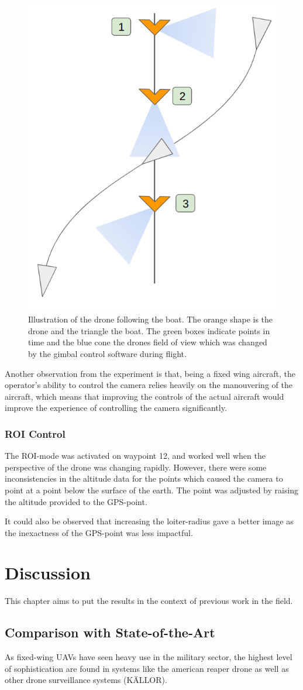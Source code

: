 \documentclass[nofilelist]{cslthse-msc}
\begin{document}
\begin{figure}[htp]
   \centering
   \includegraphics[width=.33\textwidth]{images/drone-boat-illustration.png}
   \caption{Illustration of the drone following the boat. The orange shape is the drone and the triangle the boat. The green boxes indicate points in time and the blue cone the drones field of view which was changed by the gimbal control software during flight.}
   \label{fig:boat-follow}
\end{figure}

Another observation from the experiment is that, being a fixed wing aircraft, the operator's ability to control the camera relies heavily on the manouvering of the aircraft, which means that improving the controls of the actual aircraft would improve the experience of controlling the camera significantly. 

\subsection{ROI Control}
The ROI-mode was activated on waypoint 12, and worked well when the perspective of the drone was changing rapidly. However, there were some inconsistencies in the altitude data for the points which caused the camera to point at a point below the surface of the earth. The point was adjusted by raising the altitude provided to the GPS-point. 

It could also be observed that increasing the loiter-radius gave a better image as the inexactness of the GPS-point was less impactful.


\chapter{Discussion}
This chapter aims to put the results in the context of previous work in the field.

\section{Comparison with State-of-the-Art}
As fixed-wing UAVs have seen heavy use in the military sector, the highest level of sophistication are found in systems like the american reaper drone as well as other drone surveillance systems (KÄLLOR).
\end{document}
